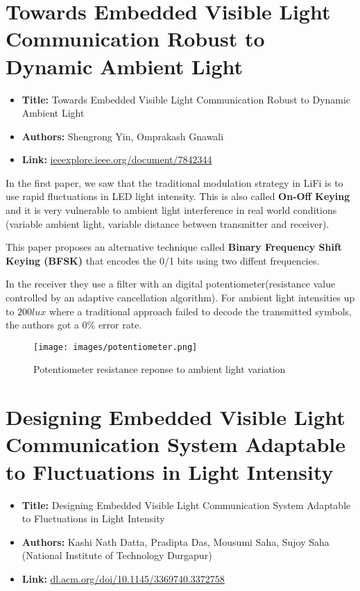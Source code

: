 \documentclass[a4paper,12pt,twoside]{article}
\begin{document}
	\section{Towards Embedded Visible Light Communication Robust to Dynamic Ambient Light}
	\begin{tcolorbox}
		\begin{itemize}
			\item \textbf{Title:} Towards Embedded Visible Light Communication Robust to Dynamic Ambient Light
			\item \textbf{Authors:} Shengrong Yin, Omprakash Gnawali
			\item \textbf{Link:} \href{https://ieeexplore.ieee.org/document/7842344}{ieeexplore.ieee.org/document/7842344}
		\end{itemize}
	\end{tcolorbox}
	
	In the first paper, we saw that the traditional modulation strategy in LiFi is to use rapid fluctuations in LED light intensity. This is also called \textbf{On-Off Keying} and it is very vulnerable to ambient light interference in real world conditions (variable ambient light, variable distance between transmitter and receiver).
	
	This paper proposes an alternative technique called \textbf{Binary Frequency Shift Keying (BFSK)} that encodes the 0/1 bits using two diffent frequencies. 
	
	
	In the receiver they use a filter with an digital potentiometer(resistance value controlled by an adaptive cancellation algorithm). For ambient light intensities up to $200 lux$ where a traditional approach failed to decode the transmitted symbols, the authors got a $0\%$ error rate.
	
	\begin{figure}[h]
		\centering
		\texttt{[image: images/potentiometer.png]}
		\caption{Potentiometer resistance reponse to ambient light variation}
	\end{figure}
	
	\section{Designing Embedded Visible Light Communication System Adaptable to Fluctuations in Light Intensity}
	\begin{tcolorbox}
		\begin{itemize}
			\item \textbf{Title:} Designing Embedded Visible Light Communication System Adaptable to Fluctuations in Light Intensity
			\item \textbf{Authors:} Kashi Nath Datta, Pradipta Das, Mousumi Saha, Sujoy Saha (National Institute of Technology Durgapur)
			\item \textbf{Link:} \href{https://dl.acm.org/doi/10.1145/3369740.3372758}{dl.acm.org/doi/10.1145/3369740.3372758}
		\end{itemize}
	\end{tcolorbox}
	
\end{document}

